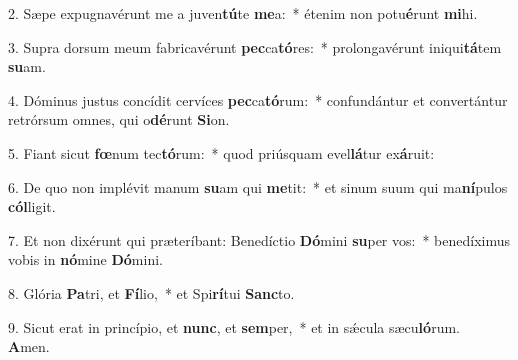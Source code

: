 2. Sæpe expugnavérunt me a juven\textbf{tú}te \textbf{me}a:~*  étenim non potu\textbf{é}runt \textbf{mi}hi.\

3. Supra dorsum meum fabricavérunt \textbf{pec}ca\textbf{tó}res:~*  prolongavérunt iniqui\textbf{tá}tem \textbf{su}am.\

4. Dóminus justus concídit cervíces \textbf{pec}ca\textbf{tó}rum:~*  confundántur et convertántur retrórsum omnes, qui o\textbf{dé}runt \textbf{Si}on.\

5. Fiant sicut \textbf{fœ}num tec\textbf{tó}rum:~*  quod priúsquam evel\textbf{lá}tur ex\textbf{á}ruit:\

6. De quo non implévit manum \textbf{su}am qui \textbf{me}tit:~*  et sinum suum qui ma\textbf{ní}pulos \textbf{cól}ligit.\

7. Et non dixérunt qui præteríbant: Benedíctio \textbf{Dó}mini \textbf{su}per vos:~*  benedíximus vobis in \textbf{nó}mine \textbf{Dó}mini.\

8. Glória \textbf{Pa}tri, et \textbf{Fí}lio,~*  et Spi\textbf{rí}tui \textbf{Sanc}to.\

9. Sicut erat in princípio, et \textbf{nunc}, et \textbf{sem}per,~*  et in sǽcula sæcu\textbf{ló}rum. \textbf{A}men.\

